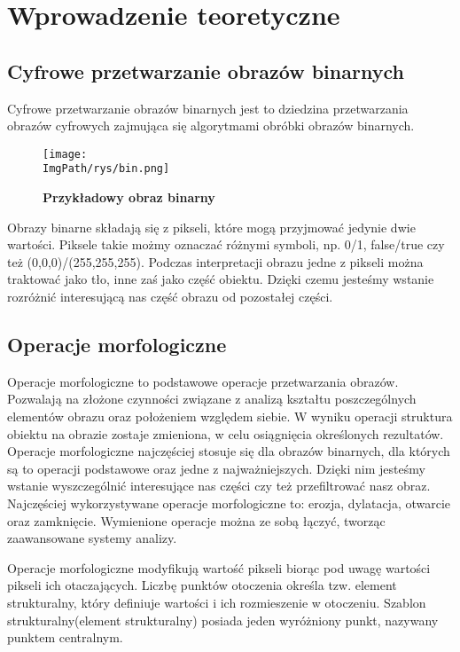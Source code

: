 \documentclass[a4paper,12pt,twoside,openany]{report}
\newcommand{\ImgPath}{.}
\begin{document}
\chapter{Wprowadzenie teoretyczne}
\section{Cyfrowe przetwarzanie obrazów binarnych}
Cyfrowe przetwarzanie obrazów binarnych jest to dziedzina przetwarzania obrazów cyfrowych zajmująca się algorytmami obróbki obrazów binarnych. 

\begin{figure}[H]	
	\centering
	\texttt{[image: \\ImgPath/rys/bin.png]}
	
	\caption{  \textbf{Przykładowy obraz binarny}}
\end{figure}

Obrazy binarne składają się z pikseli, które mogą przyjmować jedynie dwie wartości. Piksele takie możmy oznaczać różnymi symboli, np. 0/1, false/true czy też (0,0,0)/(255,255,255). Podczas interpretacji obrazu jedne z pikseli można traktować jako tło, inne zaś jako część obiektu. Dzięki czemu jesteśmy wstanie rozróżnić interesującą nas część obrazu od pozostałej części. 

\section{Operacje morfologiczne}
Operacje morfologiczne to podstawowe operacje przetwarzania obrazów. Pozwalają na złożone czynności związane z analizą kształtu poszczególnych elementów obrazu oraz położeniem względem siebie. W wyniku operacji struktura obiektu na obrazie zostaje zmieniona, w celu osiągnięcia określonych rezultatów. 
Operacje morfologiczne najczęściej stosuje się dla obrazów binarnych, dla których są to operacji podstawowe oraz jedne z najważniejszych. Dzięki nim jesteśmy wstanie wyszczególnić interesujące nas części czy też przefiltrować nasz obraz. Najczęściej wykorzystywane operacje morfologiczne to: erozja, dylatacja, otwarcie oraz zamknięcie. Wymienione operacje można ze sobą łączyć, tworząc zaawansowane systemy analizy.

Operacje morfologiczne modyfikują wartość pikseli biorąc pod uwagę wartości pikseli ich otaczających. Liczbę punktów otoczenia określa tzw. element strukturalny, który definiuje wartości i ich rozmieszenie w otoczeniu. Szablon strukturalny(element strukturalny) posiada jeden wyróżniony punkt, nazywany punktem centralnym.
\end{document}
